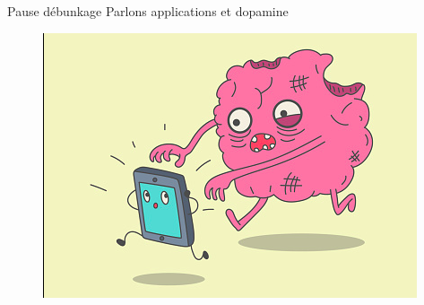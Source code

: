 \begin{frame}{Pause débunkage }{Parlons applications et dopamine}
\begin{figure}
    \centering
    \includegraphics[scale=0.5]{chapitre2/wdd7/fig/dopa.png}
\end{figure}
\end{frame}


